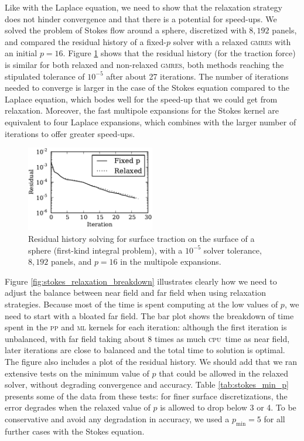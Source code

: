 \documentclass[final,leqno,]{siamltex1213}
\newcommand{\cpu}{\textsc{cpu}}
\newcommand{\mtol}{\textsc{m}\texttwooldstyle\textsc{l}\xspace} %
\newcommand{\ptop}{\textsc{p}\texttwooldstyle\textsc{p}\xspace} %
\newcommand{\pmin}{p_{\text{min}}}
\newcommand{\gmres}{\textsc{gmres}\xspace}
\begin{document}
Like with the Laplace equation, we need to show that the relaxation strategy does not hinder convergence and that there is a potential for speed-ups. We solved the problem of Stokes flow around a sphere, discretized with $8,192$ panels, and compared the residual history of a fixed-$p$ solver with a relaxed \gmres with an initial $p=16$. Figure \ref{fig:stokes_residual_history_relaxed} shows that the residual history (for the traction force) is similar for both relaxed and non-relaxed \gmres, both methods reaching the stipulated tolerance of $10^{-5}$ after about 27 iterations.
The number of iterations needed to converge is larger in the case of the Stokes equation compared to the Laplace equation, which bodes well for the speed-up that we could get from relaxation. Moreover, the fast multipole expansions for the Stokes kernel are equivalent to four Laplace expansions, which combines with the larger number of iterations to offer greater speed-ups.


\begin{figure}%
\begin{center}
	\includegraphics[natwidth=3in,natheight=2in,width=0.5\textwidth]{StokesResidualHistory.pdf}
	\caption{Residual history solving for surface traction on the surface of a sphere (first-kind integral problem), with a $10^{-5}$ solver tolerance, $8,192$ panels, and $p=16$ in the multipole expansions.}
	\label{fig:stokes_residual_history_relaxed}
\end{center}
\end{figure}

Figure \ref{fig:stokes_relaxation_breakdown} illustrates clearly how we need to adjust the balance between near field and far field when using relaxation strategies. Because most of the time is spent computing at the low values of $p$, we need to start with a bloated far field. The bar plot shows the breakdown of time spent in the {\ptop} and {\mtol} kernels for each iteration: although the first iteration is unbalanced, with far field taking about 8 times as much \cpu\ time as near field, later iterations are close to balanced and the total time to solution is optimal. 
The figure also includes a plot of the residual history. We should add that we ran extensive tests on the minimum value of $p$ that could be allowed in the relaxed solver, without degrading convergence and accuracy. Table \ref{tab:stokes_min_p} presents some of the data from these tests: for finer surface discretizations, the error degrades when the relaxed value of $p$ is allowed to drop below 3 or 4. To be conservative and avoid any degradation in accuracy, we used a $\pmin=5$ for all further cases with the Stokes equation.
\end{document}
